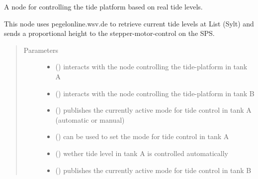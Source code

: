 \documentclass[a4paper,12pt,english]{article}
\begin{document}
\label{\detokenize{meso_control_pkg:module-meso_control_pkg.tide_sim}}

\begin{fulllineitems}
\label{\detokenize{meso_control_pkg:meso_control_pkg.tide_sim.TideSim}}
A node for controlling the tide platform based on real tide levels.

This node uses pegelonline.wsv.de to retrieve current tide levels at List (Sylt)
and sends a proportional height to the stepper-motor-control on the SPS.
\begin{quote}\begin{description}
\item[{Parameters}] \leavevmode\begin{itemize}
\item {} 
 () \textendash{} interacts with the node controlling the tide-platform in tank A

\item {} 
 () \textendash{} interacts with the node controlling the tide-platform in tank B

\item {} 
 () \textendash{} publishes the currently active mode for tide control in
tank A (automatic or manual)

\item {} 
 () \textendash{} can be used to set the mode for tide control in tank A

\item {} 
 () \textendash{} wether tide level in tank A is controlled automatically

\item {} 
 () \textendash{} publishes the currently active mode for tide control in
tank B


\end{itemize}
\end{description}
\end{quote}
\end{fulllineitems}
\end{document}

